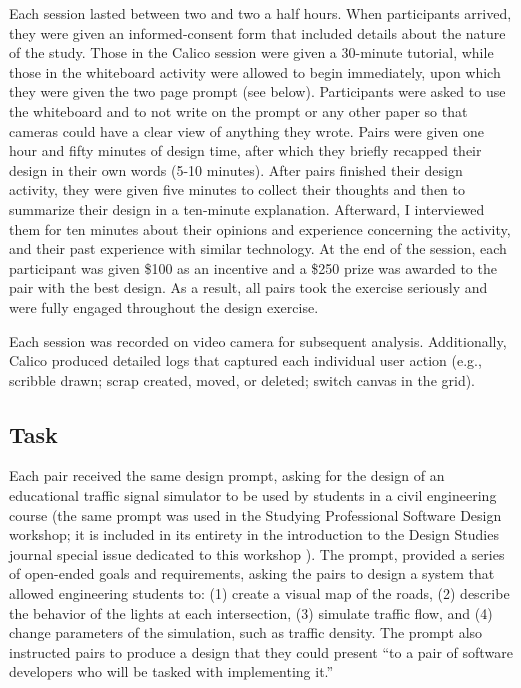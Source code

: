 Each session lasted between two and two a half hours. When participants arrived, they were given an informed-consent form that included details about the nature of the study. Those in the Calico session were given a 30-minute tutorial, while those in the whiteboard activity were allowed to begin immediately, upon which they were given the two page prompt (see below). Participants were asked to use the whiteboard and to not write on the prompt or any other paper so that cameras could have a clear view of anything they wrote. Pairs were given one hour and fifty minutes of design time, after which they briefly recapped their design in their own words (5-10 minutes). After pairs finished their design activity, they were given five minutes to collect their thoughts and then to summarize their design in a ten-minute explanation. Afterward, I interviewed them for ten minutes about their opinions and experience concerning the activity, and their past experience with similar technology. At the end of the session, each participant was given \$100 as an incentive and a \$250 prize was awarded to the pair with the best design. As a result, all pairs took the exercise seriously and were fully engaged throughout the design exercise. 

Each session was recorded on video camera for subsequent analysis. Additionally, Calico produced detailed logs that captured each individual user action (e.g., scribble drawn; scrap created, moved, or deleted; switch canvas in the grid).

\subsection {Task}
\label{experimentaldesign:3}

Each pair received the same design prompt, asking for the design of an educational traffic signal simulator to be used by students in a civil engineering course (the same prompt was used in the Studying Professional Software Design workshop; it is included in its entirety in the introduction to the Design Studies journal special issue dedicated to this workshop \citep{Petreb}). The prompt, provided a series of open-ended goals and requirements, asking the pairs to design a system that allowed engineering students to: (1) create a visual map of the roads, (2) describe the behavior of the lights at each intersection, (3) simulate traffic flow, and (4) change parameters of the simulation, such as traffic density. The prompt also instructed pairs to produce a design that they could present ``to a pair of software developers who will be tasked with implementing it.'' 

